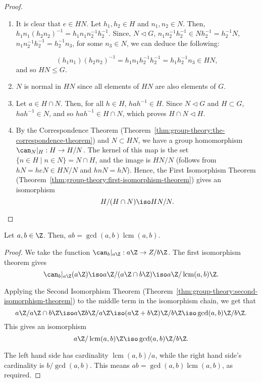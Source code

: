 \documentclass[12pt]{report}
\newcommand{\lcm}{\operatorname{lcm}}
\begin{document}
\begin{proof}
  \begin{enumerate}
  \item
    It is clear that \(e \in HN\).
    Let \(h_{1}, h_{2} \in H\) and \(n_{1}, n_{2} \in N\).
    Then, \(h_{1}n_{1}(h_{2}n_{2})^{-1} = h_{1}n_{1}n_{2}^{-1}h_{2}^{-1}\).
    Since, \(N \triangleleft G\), \(n_{1}n_{2}^{-1}h_{2}^{-1} \in Nh_{2}^{-1} = h_{2}^{-1}N\), \(n_{1}n_{2}^{-1}h_{2}^{-1} = h_{2}^{-1}n_{3}\), for some \(n_{3} \in N\), we can deduce the following:

    \[(h_{1}n_{1})(h_{2}n_{2})^{-1} = h_{1}n_{1}h_{2}^{-1}h_{2}^{-1} = h_{1}h_{2}^{-1}n_{3} \in HN,\]
    and so \(HN \leq G\).

    \item
      \(N\) is normal in \(HN\) since all elements of \(HN\) are also elements of \(G\).

    \item
      Let \(a \in H \cap N\).
      Then, for all \(h \in H\), \(hah^{-1} \in H\).
      Since \(N \triangleleft G\) and \(H \subset G\), \(hah^{-1} \in N\), and so \(hah^{-1} \in H \cap N\), which proves \(H\cap N \triangleleft H\).
    \item
     By the Correspondence Theorem (Theorem~\ref{thm:group-theory:the-correspondence-theorem}) and \(N \subset HN\), we have a group homomorphism \(\can_{N}|_{H}: H \to H/N\).
     The kernel of this map is the set \(\{n \in H \mid n \in N\} = N \cap H\), and the image is \(HN/N\) (follows from \(hN = heN \in HN/N\) and \(hnN = hN\)).
     Hence, the First Isomorphism Theorem (Theorem~\ref{thm:group-theory:first-isomorphism-theorem}) gives an isomorphism
     \[H/(H\cap N) \iso HN/N.\]
  \end{enumerate}
\end{proof}

\begin{corollary}
  Let \(a,b \in \Z\).
  Then, \(ab = \gcd(a,b)\lcm(a,b)\).
\end{corollary}

\begin{proof}
  We take the function \(\can_{b}|_{a\Z} : a\Z \to Z / b\Z\).
  The first isomorphism theorem gives
  \[\can_{b}|_{a\Z}(a\Z) \iso a\Z / (a\Z \cap b\Z) \iso a\Z / \lcm(a,b)\Z.\]

  Applying the Second Isomorphism Theorem (Theorem~\ref{thm:group-theory:second-isomorphism-theorem}) to the middle term in the isomorphism chain, we get that
  \[a\Z / a\Z \cap b\Z \iso a\Z b\Z / a\Z \iso (a\Z + b\Z)\Z / b\Z \iso \gcd(a,b) \Z / b\Z.\]
  This gives an isomorphism
  \[a\Z/ \lcm(a,b)\Z \iso \gcd(a,b)\Z/ b\Z.\]

  The left hand side has cardinality \(\lcm(a,b)/a\), while the right hand side's cardinality is \(b/\gcd(a,b)\).
  This means \(ab = \gcd(a,b)\lcm(a,b)\), as required.


\end{proof}
\end{document}
